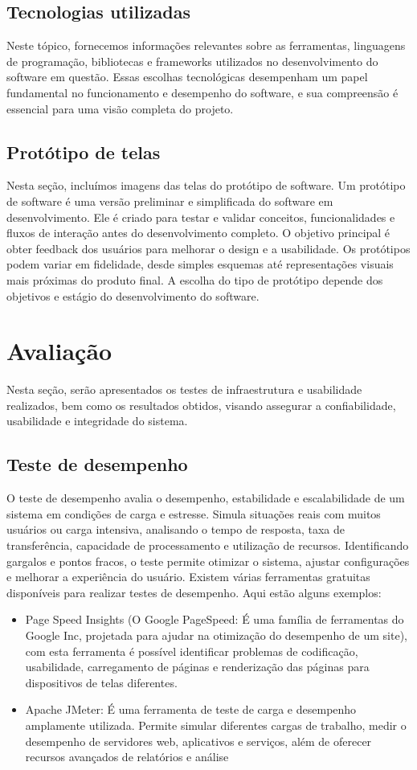\documentclass[12pt]{article}
\begin{document}
\subsection{Tecnologias utilizadas}
Neste tópico, fornecemos informações relevantes sobre as ferramentas, linguagens de programação, bibliotecas e frameworks utilizados no desenvolvimento do software em questão. Essas escolhas tecnológicas desempenham um papel fundamental no funcionamento e desempenho do software, e sua compreensão é essencial para uma visão completa do projeto. 

\subsection{Protótipo de telas}
Nesta seção, incluímos imagens das telas do protótipo de software. Um protótipo de software é uma versão preliminar e simplificada do software em desenvolvimento. Ele é criado para testar e validar conceitos, funcionalidades e fluxos de interação antes do desenvolvimento completo. O objetivo principal é obter feedback dos usuários para melhorar o design e a usabilidade. Os protótipos podem variar em fidelidade, desde simples esquemas até representações visuais mais próximas do produto final. A escolha do tipo de protótipo depende dos objetivos e estágio do desenvolvimento do software.

\section{Avaliação}
Nesta seção, serão apresentados os testes de infraestrutura e usabilidade realizados, bem como os resultados obtidos, visando assegurar a confiabilidade, usabilidade e integridade do sistema.

\subsection{Teste de desempenho}
O teste de desempenho avalia o desempenho, estabilidade e escalabilidade de um sistema em condições de carga e estresse. Simula situações reais com muitos usuários ou carga intensiva, analisando o tempo de resposta, taxa de transferência, capacidade de processamento e utilização de recursos. Identificando gargalos e pontos fracos, o teste permite otimizar o sistema, ajustar configurações e melhorar a experiência do usuário. Existem várias ferramentas gratuitas disponíveis para realizar testes de desempenho. Aqui estão alguns exemplos:
\begin{itemize}
   \item Page Speed Insights (O Google PageSpeed: É
uma família de ferramentas do Google Inc, projetada para ajudar na otimização do
desempenho de um site), com esta ferramenta é possível identificar problemas de
codificação, usabilidade, carregamento de páginas e renderização das páginas para
dispositivos de telas diferentes. 
\item Apache JMeter: É uma ferramenta de teste de carga e desempenho amplamente utilizada. Permite simular diferentes cargas de trabalho, medir o desempenho de servidores web, aplicativos e serviços, além de oferecer recursos avançados de relatórios e análise
 \end{itemize}
 
\end{document}
